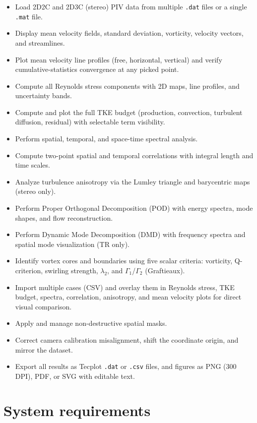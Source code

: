 \documentclass[11pt, a4paper]{report}
\begin{document}
\begin{itemize}[leftmargin=1.5em]
  \item Load 2D2C and 2D3C (stereo) PIV data from multiple \texttt{.dat} files or a single \texttt{.mat} file.
  \item Display mean velocity fields, standard deviation, vorticity, velocity vectors, and streamlines.
  \item Plot mean velocity line profiles (free, horizontal, vertical) and verify cumulative-statistics convergence at any picked point.
  \item Compute all Reynolds stress components with 2D maps, line profiles, and uncertainty bands.
  \item Compute and plot the full TKE budget (production, convection, turbulent diffusion, residual) with selectable term visibility.
  \item Perform spatial, temporal, and space-time spectral analysis.
  \item Compute two-point spatial and temporal correlations with integral length and time scales.
  \item Analyze turbulence anisotropy via the Lumley triangle and barycentric maps (stereo only).
  \item Perform Proper Orthogonal Decomposition (POD) with energy spectra, mode shapes, and flow reconstruction.
  \item Perform Dynamic Mode Decomposition (DMD) with frequency spectra and spatial mode visualization (TR only).
  \item Identify vortex cores and boundaries using five scalar criteria: vorticity, Q-criterion, swirling strength, $\lambda_2$, and $\Gamma_1$/$\Gamma_2$ (Graftieaux).
  \item Import multiple cases (CSV) and overlay them in Reynolds stress, TKE budget, spectra, correlation, anisotropy, and mean velocity plots for direct visual comparison.
  \item Apply and manage non-destructive spatial masks.
  \item Correct camera calibration misalignment, shift the coordinate origin, and mirror the dataset.
  \item Export all results as Tecplot \texttt{.dat} or \texttt{.csv} files, and figures as PNG (300 DPI), PDF, or SVG with editable text.
\end{itemize}

\section{System requirements}
\end{document}
